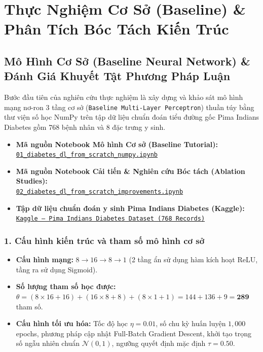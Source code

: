 \documentclass[12pt,a4paper]{report}
\begin{document}
\chapter{Thực Nghiệm Cơ Sở (Baseline) \& Phân Tích Bóc Tách Kiến Trúc}

\section{Mô Hình Cơ Sở (Baseline Neural Network) \& Đánh Giá Khuyết Tật Phương Pháp Luận}
Bước đầu tiên của nghiên cứu thực nghiệm là xây dựng và khảo sát mô hình mạng nơ-ron 3 tầng cơ sở (\texttt{Baseline Multi-Layer Perceptron}) thuần túy bằng thư viện số học NumPy trên tập dữ liệu chuẩn đoán tiểu đường gốc Pima Indians Diabetes gồm 768 bệnh nhân và 8 đặc trưng y sinh.

\begin{itemize}[leftmargin=1.5em, itemsep=3pt]
    \item \textbf{Mã nguồn Notebook Mô hình Cơ sở (Baseline Tutorial):}\\ \href{https://github.com/phamtu2x5/INTELLIGENT-SYSTEM-DEVELOPMENT/blob/main/src/Assigment%2003/diabetes/notebooks/01_diabetes_dl_from_scratch_numpy.ipynb}{\texttt{01\_diabetes\_dl\_from\_scratch\_numpy.ipynb}}
    \item \textbf{Mã nguồn Notebook Cải tiến \& Nghiên cứu Bóc tách (Ablation Studies):}\\ \href{https://github.com/phamtu2x5/INTELLIGENT-SYSTEM-DEVELOPMENT/blob/main/src/Assigment%2003/diabetes/notebooks/02_diabetes_dl_from_scratch_improvements.ipynb}{\texttt{02\_diabetes\_dl\_from\_scratch\_improvements.ipynb}}
    \item \textbf{Tập dữ liệu chuẩn đoán y sinh Pima Indians Diabetes (Kaggle):}\\ \href{https://www.kaggle.com/datasets/hasibur013/diabetes-dataset}{\texttt{Kaggle -- Pima Indians Diabetes Dataset (768 Records)}}
\end{itemize}

\subsection{1. Cấu hình kiến trúc và tham số mô hình cơ sở}
\begin{itemize}
    \item \textbf{Cấu hình mạng:} $8 \to 16 \to 8 \to 1$ (2 tầng ẩn sử dụng hàm kích hoạt ReLU, tầng ra sử dụng Sigmoid).
    \item \textbf{Số lượng tham số học được:} $\theta = (8 \times 16 + 16) + (16 \times 8 + 8) + (8 \times 1 + 1) = 144 + 136 + 9 = \mathbf{289}$ tham số.
    \item \textbf{Cấu hình tối ưu hóa:} Tốc độ học $\eta = 0.01$, số chu kỳ huấn luyện $1,000$ epochs, phương pháp cập nhật Full-Batch Gradient Descent, khởi tạo trọng số ngẫu nhiên chuẩn $\mathcal{N}(0, 1)$, ngưỡng quyết định mặc định $\tau = 0.50$.
\end{itemize}
\end{document}
